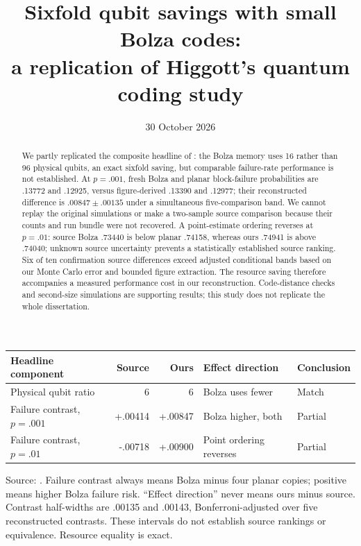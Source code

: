 \documentclass[11pt]{article}
\title{Sixfold qubit savings with small Bolza codes:\\a replication of Higgott's quantum coding study}
\date{30 October 2026}
\begin{document}
\maketitle\vspace{-2em}
\begin{abstract}
We partly replicated the composite headline of \citet{thesis}: the Bolza memory uses 16 rather than 96 physical qubits, an exact sixfold saving, but comparable failure-rate performance is not established. At $p=.001$, fresh Bolza and planar block-failure probabilities are .13772 and .12925, versus figure-derived .13390 and .12977; their reconstructed difference is $.00847\pm.00135$ under a simultaneous five-comparison band. We cannot replay the original simulations or make a two-sample source comparison because their counts and run bundle were not recovered. A point-estimate ordering reverses at $p=.01$: source Bolza .73440 is below planar .74158, whereas ours .74941 is above .74040; unknown source uncertainty prevents a statistically established source ranking. Six of ten confirmation source differences exceed adjusted conditional bands based on our Monte Carlo error and bounded figure extraction. The resource saving therefore accompanies a measured performance cost in our reconstruction. Code-distance checks and second-size simulations are supporting results; this study does not replicate the whole dissertation.
\end{abstract}
\begin{center}\small
\begin{tabular}{p{.24\linewidth}rrp{.21\linewidth}l}
\toprule Headline component & Source & Ours & Effect direction & Conclusion\\\midrule
Physical qubit ratio & 6 & 6 & Bolza uses fewer & Match\\
Failure contrast, $p=.001$ & +.00414 & +.00847 & Bolza higher, both & Partial\\
Failure contrast, $p=.01$ & -.00718 & +.00900 & Point ordering reverses & Partial\\\bottomrule
\end{tabular}
\end{center}
\noindent\small Source: \citet[pp.~177--178, Figure~7.14a]{thesis}. Failure contrast always means Bolza minus four planar copies; positive means higher Bolza failure risk. ``Effect direction'' never means ours minus source. Contrast half-widths are .00135 and .00143, Bonferroni-adjusted over five reconstructed contrasts. These intervals do not establish source rankings or equivalence. Resource equality is exact.\normalsize
\end{document}
